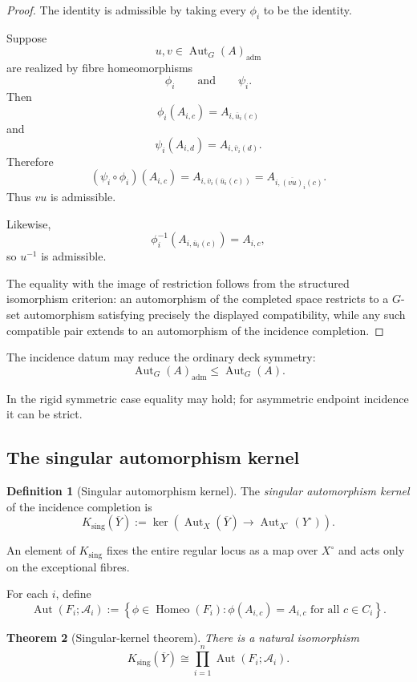 \documentclass[11pt]{article}
\theoremstyle{plain}
\newtheorem{theorem}{Theorem}[section]
\theoremstyle{definition}
\newtheorem{definition}[theorem]{Definition}
\begin{document}
\begin{proof}
The identity is admissible by taking every $\phi_i$ to be the identity.

Suppose
\[
u,v\in\operatorname{Aut}_G(A)_{\mathrm{adm}}
\]
are realized by fibre homeomorphisms
\[
\phi_i
\qquad\text{and}\qquad
\psi_i.
\]
Then
\[
\phi_i(A_{i,c})
=
A_{i,\overline u_i(c)}
\]
and
\[
\psi_i(A_{i,d})
=
A_{i,\overline v_i(d)}.
\]
Therefore
\[
(\psi_i\circ\phi_i)(A_{i,c})
=
A_{i,
\overline v_i(\overline u_i(c))}
=
A_{i,\overline{(vu)}_i(c)}.
\]
Thus $vu$ is admissible.

Likewise,
\[
\phi_i^{-1}
\left(
A_{i,\overline u_i(c)}
\right)
=
A_{i,c},
\]
so $u^{-1}$ is admissible.

The equality with the image of restriction follows from the structured
isomorphism criterion:
an automorphism of the completed space restricts to a $G$-set
automorphism satisfying precisely the displayed compatibility, while any
such compatible pair extends to an automorphism of the incidence
completion.
\end{proof}

The incidence datum may reduce the ordinary deck symmetry:
\[
\operatorname{Aut}_G(A)_{\mathrm{adm}}
\leq
\operatorname{Aut}_G(A).
\]

In the rigid symmetric case equality may hold; for asymmetric endpoint
incidence it can be strict.

\subsection{The singular automorphism kernel}
\label{subsec:singular-kernel}


\begin{definition}[Singular automorphism kernel]
\label{def:singular-kernel}
The \emph{singular automorphism kernel} of the incidence completion is
\[
K_{\mathrm{sing}}(\overline Y)
:=
\ker
\left(
\operatorname{Aut}_X(\overline Y)
\longrightarrow
\operatorname{Aut}_{X^\circ}(Y^\circ)
\right).
\]
\end{definition}

An element of $K_{\mathrm{sing}}$ fixes the entire regular locus as a map
over $X^\circ$ and acts only on the exceptional fibres.

For each $i$, define
\[
\operatorname{Aut}(F_i;\mathcal A_i)
:=
\left\{
\phi\in\operatorname{Homeo}(F_i):
\phi(A_{i,c})=A_{i,c}
\text{ for all }c\in C_i
\right\}.
\]

\begin{theorem}[Singular-kernel theorem]
\label{thm:singular-kernel}
There is a natural isomorphism
\[
K_{\mathrm{sing}}(\overline Y)
\cong
\prod_{i=1}^n
\operatorname{Aut}(F_i;\mathcal A_i).
\]
\end{theorem}
\end{document}
